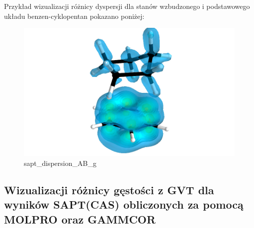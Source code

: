 \documentclass[11pt]{article}
\begin{document}
    Przykład wizualizacji różnicy dyspersji dla stanów wzbudzonego i
podstawowego układu benzen-cyklopentan pokazano poniżej:

\begin{figure}
\centering
\includegraphics{Examples/benzcyclo_excite/sapt_dispersion_AB_eg.png}
\caption{sapt\_dispersion\_AB\_g}
\end{figure}

    \hypertarget{wizualizacji-ruxf3ux17cnicy-gux119stoux15bci-z-gvt-dla-wynikuxf3w-saptcas-obliczonych-za-pomocux105-molpro-oraz-gammcor}{%
\subsection{Wizualizacji różnicy gęstości z GVT dla wyników SAPT(CAS)
obliczonych za pomocą MOLPRO oraz
GAMMCOR}\label{wizualizacji-ruxf3ux17cnicy-gux119stoux15bci-z-gvt-dla-wynikuxf3w-saptcas-obliczonych-za-pomocux105-molpro-oraz-gammcor}}
\end{document}
